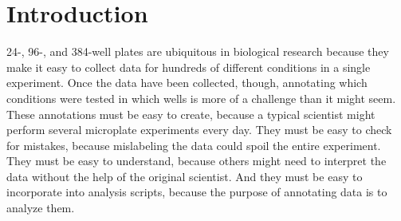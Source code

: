 \documentclass{bmcart}
\begin{document}

\section*{Introduction}

24-, 96-, and 384-well plates are ubiquitous in biological research because they make it easy to collect data for hundreds of different conditions in a single experiment. Once the data have been collected, though, annotating which conditions were tested in which wells is more of a challenge than it might seem. These annotations must be easy to create, because a typical scientist might perform several microplate experiments every day. They must be easy to check for mistakes, because mislabeling the data could spoil the entire experiment. They must be easy to understand, because others might need to interpret the data without the help of the original scientist. And they must be easy to incorporate into analysis scripts, because the purpose of annotating data is to analyze them.
\end{document}
